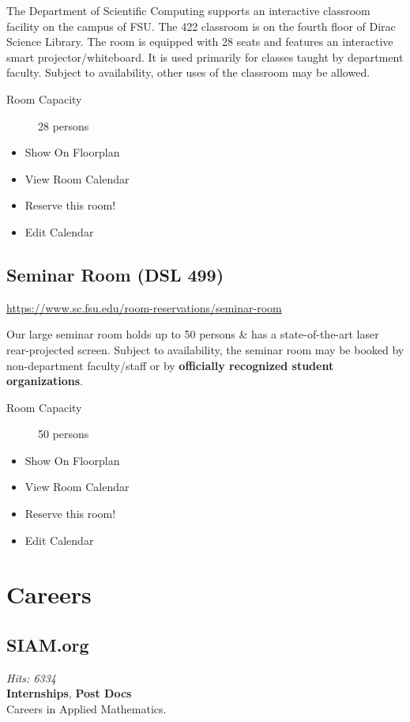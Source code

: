 \documentclass[12pt,a4paper]{article}
\begin{document}
The Department of Scientific Computing supports an interactive classroom facility on the campus of FSU. The 422 classroom is on the fourth floor of Dirac Science Library. The room is equipped with 28 seats and features an interactive smart projector/whiteboard. It is used primarily for classes taught by department faculty. Subject to availability, other uses of the classroom may be allowed.
\begin{description}
    \item[Room Capacity] 28 persons
\end{description}
\begin{itemize}
    \item Show On Floorplan
    \item View Room Calendar
    \item Reserve this room!
    \item Edit Calendar
\end{itemize}

\subsection{Seminar Room (DSL 499)}
\url{https://www.sc.fsu.edu/room-reservations/seminar-room}

Our large seminar room holds up to 50 persons \& has a state-of-the-art laser rear-projected screen. Subject to availability, the seminar room may be booked by non-department faculty/staff or by \textbf{officially recognized student organizations}.
\begin{description}
    \item[Room Capacity] 50 persons
\end{description}
\begin{itemize}
    \item Show On Floorplan
    \item View Room Calendar
    \item Reserve this room!
    \item Edit Calendar
\end{itemize}

\section{Careers}

\subsection{SIAM.org}
\textit{Hits: 6334} \\
\textbf{Internships}, \textbf{Post Docs} \\
Careers in Applied Mathematics.
\end{document}
